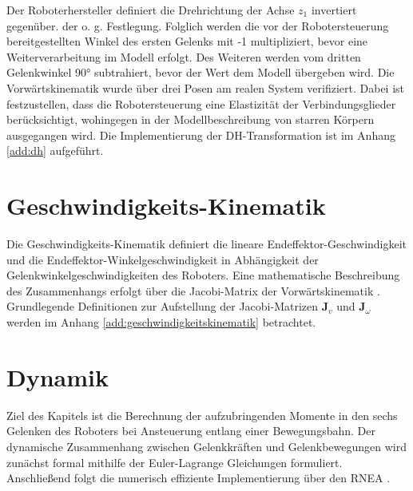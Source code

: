 Der Roboterhersteller definiert die Drehrichtung der Achse $z_{1}$ invertiert gegenüber. der o. g. Festlegung. Folglich werden die vor der Robotersteuerung bereitgestellten Winkel des ersten Gelenks  mit -1 multipliziert, bevor eine Weiterverarbeitung im Modell erfolgt. Des Weiteren werden vom dritten Gelenkwinkel 90° subtrahiert, bevor der Wert dem Modell übergeben wird. Die Vorwärtskinematik wurde über drei Posen am realen System verifiziert. Dabei ist festzustellen, dass die Robotersteuerung eine Elastizität der Verbindungsglieder berücksichtigt, wohingegen in der Modellbeschreibung von starren Körpern ausgegangen wird. Die Implementierung der DH-Transformation ist im Anhang \ref{add:dh}  aufgeführt. 
%
\section{Geschwindigkeits-Kinematik}
Die Geschwindigkeits-Kinematik definiert die lineare Endeffektor-Geschwindigkeit und die  Endeffektor-Winkelgeschwindigkeit in Abh{\"a}ngigkeit der Gelenkwinkelgeschwindigkeiten des Roboters. Eine mathematische Beschreibung des Zusammenhangs erfolgt {\"u}ber die Jacobi-Matrix der Vorw{\"a}rtskinematik \cite[S.~101]{Spong.2020}. Grundlegende Definitionen zur Aufstellung der Jacobi-Matrizen $\bm{J}_v$ und $\bm{J}_{\omega}$ werden im Anhang  \ref{add:geschwindigkeitskinematik} betrachtet. 
%
\section{Dynamik}
Ziel des Kapitels ist die Berechnung der aufzubringenden Momente in den sechs Gelenken des Roboters bei Ansteuerung entlang einer Bewegungsbahn.
Der dynamische Zusammenhang zwischen Gelenkkräften und Gelenkbewegungen wird zunächst formal mithilfe der Euler-Lagrange Gleichungen formuliert. Anschließend folgt die numerisch effiziente Implementierung  über den RNEA \cite[S.~247]{Grimble.2009}. 
%
